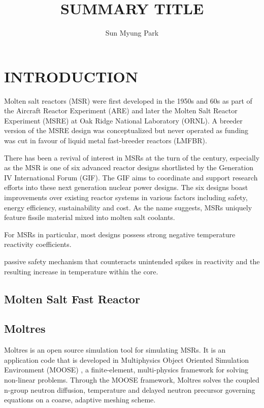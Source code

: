 \documentclass[letterpaper]{mandc2019}
\begin{document}
\title{SUMMARY TITLE}
\author{Sun Myung Park}

\maketitle
\justify

\section{INTRODUCTION}

Molten salt reactors (MSR) were first developed in the 1950s and 60s as part of the Aircraft Reactor Experiment (ARE) and later the Molten Salt Reactor Experiment (MSRE) at Oak Ridge National Laboratory (ORNL). A breeder version of the MSRE design was conceptualized but never operated as funding was cut in favour of liquid metal fast-breeder reactors (LMFBR).

There has been a revival of interest in MSRs at the turn of the century, especially as the MSR is one of six advanced reactor designs shortlisted by the Generation IV International Forum (GIF). The GIF aims to coordinate and support research efforts into these next generation nuclear power designs. The six designs boast improvements over existing reactor systems in various factors including safety, energy efficiency, sustainability and cost. As the name suggests, MSRs uniquely feature fissile material mixed into molten salt coolants. 

For MSRs in particular, most designs possess strong negative temperature reactivity coefficients.

 passive safety mechanism that counteracts unintended spikes in reactivity and the resulting increase in temperature within the core.

\subsection{Molten Salt Fast Reactor}



\subsection{Moltres}

Moltres is an open source simulation tool for simulating MSRs. It is an application code that is developed in Multiphysics Object Oriented Simulation Environment (MOOSE) \cite{gaston_moose:_2009}, a finite-element, multi-physics framework for solving non-linear problems. Through the MOOSE framework, Moltres solves the coupled n-group neutron diffusion, temperature and delayed neutron precursor governing equations on a coarse, adaptive meshing scheme.
\end{document}
